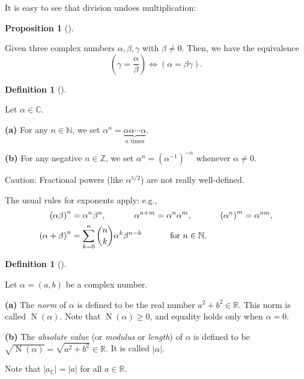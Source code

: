 \documentclass[numbers=enddot,12pt,final,onecolumn,notitlepage]{scrartcl}%
\numberwithin{exer}{subsection}
\theoremstyle{definition}
\newtheorem{prop}[theo]{Proposition}
\newenvironment{proposition}[1][]
{\begin{prop}[#1]\begin{leftbar}}
{\end{leftbar}\end{prop}}
\newtheorem{defi}[theo]{Definition}
\newenvironment{definition}[1][]
{\begin{defi}[#1]\begin{leftbar}}
{\end{leftbar}\end{defi}}
\let\sumnonlimits\sum
\renewcommand{\sum}{\sumnonlimits\limits}
\begin{document}
It is easy to see that division undoes multiplication:

\begin{proposition}
Given three complex numbers $\alpha,\beta,\gamma$ with $\beta\neq0$. Then, we
have the equivalence%
\[
\left(  \gamma=\dfrac{\alpha}{\beta}\right)  \Longleftrightarrow\left(
\alpha=\beta\gamma\right)  .
\]

\end{proposition}

\begin{definition}
Let $\alpha\in\mathbb{C}$.

\textbf{(a)} For any $n\in\mathbb{N}$, we set $\alpha^{n}=\underbrace{\alpha
\alpha\cdots\alpha}_{n\text{ times}}$.

\textbf{(b)} For any negative $n\in\mathbb{Z}$, we set $\alpha^{n}=\left(
\alpha^{-1}\right)  ^{-n}$ whenever $\alpha\neq0$.
\end{definition}

Caution: Fractional powers (like $\alpha^{1/2}$) are not really well-defined.

The usual rules for exponents apply: e.g.,%
\begin{align*}
\left(  \alpha\beta\right)  ^{n}  &  =\alpha^{n}\beta^{n}%
,\ \ \ \ \ \ \ \ \ \ \alpha^{n+m}=\alpha^{n}\alpha^{m}%
,\ \ \ \ \ \ \ \ \ \ \left(  \alpha^{n}\right)  ^{m}=\alpha^{nm},\\
\left(  \alpha+\beta\right)  ^{n}  &  =\sum_{k=0}^{n}\dbinom{n}{k}\alpha
^{k}\beta^{n-k}\ \ \ \ \ \ \ \ \ \ \text{for }n\in\mathbb{N}\text{.}%
\end{align*}


\begin{definition}
Let $\alpha=\left(  a,b\right)  $ be a complex number.

\textbf{(a)} The \textit{norm} of $\alpha$ is defined to be the real number
$a^{2}+b^{2}\in\mathbb{R}$. This norm is called $\operatorname*{N}\left(
\alpha\right)  $. Note that $\operatorname*{N}\left(  \alpha\right)  \geq0$,
and equality holds only when $\alpha=0$.

\textbf{(b)} The \textit{absolute value} (or \textit{modulus} or
\textit{length}) of $\alpha$ is defined to be $\sqrt{\operatorname*{N}\left(
\alpha\right)  }=\sqrt{a^{2}+b^{2}}\in\mathbb{R}$. It is called $\left\vert
\alpha\right\vert $.
\end{definition}

Note that $\left\vert a_{\mathbb{C}}\right\vert =\left\vert a\right\vert $ for
all $a\in\mathbb{R}$.
\end{document}
